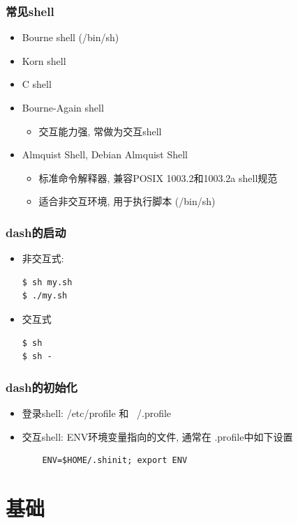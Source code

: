 \documentclass[compress]{beamer}
\begin{document}
\begin{frame}
    \frametitle{常见shell}
    \begin{itemize}
        \item Bourne shell (/bin/sh)
        \item Korn shell
        \item C shell
        \item Bourne-Again shell
            \begin{itemize}
                \item 交互能力强, 常做为交互shell
            \end{itemize}
        \item Almquist Shell, Debian Almquist Shell 
            \begin{itemize}
                \item 标准命令解释器, 兼容POSIX 1003.2和1003.2a shell规范
                \item 适合非交互环境, 用于执行脚本 (/bin/sh)
        \end{itemize}
    \end{itemize}
\end{frame}

\begin{frame}[fragile]
    \frametitle{dash的启动}
    \begin{itemize}
        \item 非交互式:
\begin{Verbatim}
$ sh my.sh
$ ./my.sh
\end{Verbatim}
        \item 交互式
\begin{Verbatim}
$ sh
$ sh -
\end{Verbatim}
    \end{itemize}
\end{frame}

\begin{frame}[fragile]
    \frametitle{dash的初始化}
    \begin{itemize}
        \item 登录shell: /etc/profile 和 ~/.profile
        \item 交互shell: ENV环境变量指向的文件, 通常在 .profile中如下设置
\begin{Verbatim}
    ENV=$HOME/.shinit; export ENV
\end{Verbatim}
    \end{itemize}
\end{frame}

\section{基础}
\end{document}
